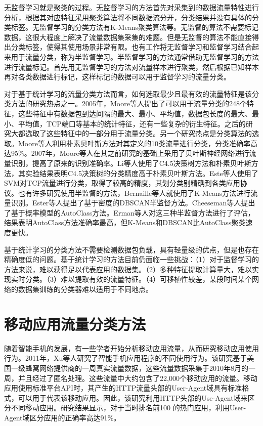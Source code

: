 无监督学习就是聚类的过程。无监督学习的方法首先对采集到的数据流量特性进行分析，根据其对应特征采用聚类算法将不同数据流分开，分类结果并没有具体的分类标签。无监督学习的分类方法有K-Means聚类算法等。无监督的算法不需要标记数据，这很大程度上解决了流量数据集采集的难题。但是无监督的算法不能直接得出分类标签，使得其使用场景非常有限。也有工作将无监督学习和监督学习结合起来用于流量分类，称为半监督学习。半监督学习的方法通常借助无监督学习的方法进行流量标记。首先用无监督学习的方法对流量样本进行聚类，然后根据已知样本再对各类数据进行标记，这样标记的数据可以用于监督学习的流量分类。

对于基于统计学习的流量分类方法而言，如何选取最少且最有效的流量特征是该分类方法的研究热点之一。2005年，Moore等人\supercite{moore2005internet}提出了可以用于流量分类的248个特征，这些特征中有数据包到达间隔的最大、最小、平均值，数据包长度的最大、最小、平均值，TCP端口等基本的统计特征，还有一些复杂的衍生特征。之后的研究大都选取了这些特征中的一部分用于流量分类。另一个研究热点是分类算法的选取。Moore等人利用朴素贝叶斯方法对其定义的10类流量进行分类，分类准确率高达95\%。2007年，Moore等人在其之前研究的基础上采用了贝叶斯神经网络进行流量识别\supercite{auld2007bayesian}，提高了原来的识别准确率。Li等人使用了C4.5决策树方法和朴素贝叶斯方法，其实验结果表明C4.5决策树的分类精度高于朴素贝叶斯方法\supercite{li2009efficient}。Este等人使用了SVM对TCP流量进行分类，取得了较高的精度，其划分类别精确到各类应用协议\supercite{este2009support}。也有许多研究使用半监督的方法，Bernaille等人就使用了K-Means方法进行流量识别\supercite{bernaille2006traffic}。Ester等人提出了基于密度的DBSCAN半监督方法\supercite{ester1996density}。Cheeseman等人提出了基于概率模型的AutoClass方法\supercite{cheeseman1993autoclass}。Erman等人对这三种半监督方法进行了评估，结果表明AutoClass方法准确率最高，但K-Means和DBSCAN比AutoClass聚类速度更快\supercite{erman2006traffic}。

基于统计学习的分类方法不需要检测数据包负载，具有轻量级的优点，但是也存在精确度低的问题。基于统计学习的方法目前仍面临一些挑战：（1）对于监督学习的方法来说，难以获得足以代表应用的数据集。（2）多种特征提取计算量大，难以实现实时分类。（3）难以提取有效的流量特征。（4）可移植性较差，某段时间某个网络的数据集训练的分类器难以适用于不同地点。


\section{移动应用流量分类方法}
随着智能手机的发展，有一些学者开始分析移动应用流量，从而研究移动应用使用行为。2011年，Xu等人研究了智能手机应用程序的不同使用行为\supercite{xu2011identifying}。该研究基于美国一级蜂窝网络提供商的一周真实流量数据，这些流量数据采集于2010年8月的一周，并且经过了匿名处理。这些流量中大约包含了22,000个移动应用的流量。移动应用使用标准平台API时，其产生的HTTP流量头部的User-Agent域具有标准格式，可以用于代表该移动应用。因此，该研究利用HTTP头部的Use-Agent域来区分不同移动应用。研究结果显示，对于当时排名前100 的热门应用，利用User-Agent域区分应用的正确率高达91\%。

